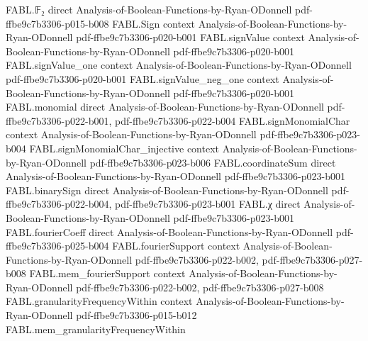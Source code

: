 \begin{theorem}
\label{FABL.relativeHammingDist_truncateWidth_le}
\leanok
{}
\proofstep
  {FABL.𝔽₂}
  {direct}
  {Analysis-of-Boolean-Functions-by-Ryan-ODonnell}
  {pdf-ffbe9c7b3306-p015-b008}
\proofstep
  {FABL.Sign}
  {context}
  {Analysis-of-Boolean-Functions-by-Ryan-ODonnell}
  {pdf-ffbe9c7b3306-p020-b001}
\proofstep
  {FABL.signValue}
  {context}
  {Analysis-of-Boolean-Functions-by-Ryan-ODonnell}
  {pdf-ffbe9c7b3306-p020-b001}
\proofstep
  {FABL.signValue_one}
  {context}
  {Analysis-of-Boolean-Functions-by-Ryan-ODonnell}
  {pdf-ffbe9c7b3306-p020-b001}
\proofstep
  {FABL.signValue_neg_one}
  {context}
  {Analysis-of-Boolean-Functions-by-Ryan-ODonnell}
  {pdf-ffbe9c7b3306-p020-b001}
\proofstep
  {FABL.monomial}
  {direct}
  {Analysis-of-Boolean-Functions-by-Ryan-ODonnell}
  {pdf-ffbe9c7b3306-p022-b001,
    pdf-ffbe9c7b3306-p022-b004}
\proofstep
  {FABL.signMonomialChar}
  {context}
  {Analysis-of-Boolean-Functions-by-Ryan-ODonnell}
  {pdf-ffbe9c7b3306-p023-b004}
\proofstep
  {FABL.signMonomialChar_injective}
  {context}
  {Analysis-of-Boolean-Functions-by-Ryan-ODonnell}
  {pdf-ffbe9c7b3306-p023-b006}
\proofstep
  {FABL.coordinateSum}
  {direct}
  {Analysis-of-Boolean-Functions-by-Ryan-ODonnell}
  {pdf-ffbe9c7b3306-p023-b001}
\proofstep
  {FABL.binarySign}
  {direct}
  {Analysis-of-Boolean-Functions-by-Ryan-ODonnell}
  {pdf-ffbe9c7b3306-p022-b004,
    pdf-ffbe9c7b3306-p023-b001}
\proofstep
  {FABL.χ}
  {direct}
  {Analysis-of-Boolean-Functions-by-Ryan-ODonnell}
  {pdf-ffbe9c7b3306-p023-b001}
\proofstep
  {FABL.fourierCoeff}
  {direct}
  {Analysis-of-Boolean-Functions-by-Ryan-ODonnell}
  {pdf-ffbe9c7b3306-p025-b004}
\proofstep
  {FABL.fourierSupport}
  {context}
  {Analysis-of-Boolean-Functions-by-Ryan-ODonnell}
  {pdf-ffbe9c7b3306-p022-b002,
    pdf-ffbe9c7b3306-p027-b008}
\proofstep
  {FABL.mem_fourierSupport}
  {context}
  {Analysis-of-Boolean-Functions-by-Ryan-ODonnell}
  {pdf-ffbe9c7b3306-p022-b002,
    pdf-ffbe9c7b3306-p027-b008}
\proofstep
  {FABL.granularityFrequencyWithin}
  {context}
  {Analysis-of-Boolean-Functions-by-Ryan-ODonnell}
  {pdf-ffbe9c7b3306-p015-b012}
\proofstep
  {FABL.mem_granularityFrequencyWithin}

\end{theorem}
